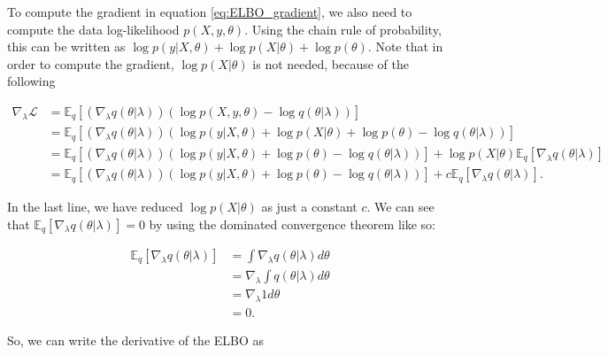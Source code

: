 To compute the gradient in equation \ref{eq:ELBO_gradient}, we also need to compute the data log-likelihood $p(X, y, \theta)$. Using the chain rule of probability, this can be written as $\log p(y | X, \theta) + \log p(X | \theta) + \log p(\theta)$. Note that in order to compute the gradient, $\log p(X | \theta)$ is not needed, because of the following

\begin{equation*}
  \begin{split}
      \nabla_{\lambda} \mathcal{L} &=
      \mathbb{E}_q \left[ \left( \nabla_{\lambda} q(\theta | \lambda) \right) \left( \log p(X, y, \theta) - \log q(\theta | \lambda) \right) \right] \\
      &= \mathbb{E}_q \left[ \left( \nabla_{\lambda} q(\theta | \lambda) \right) \left( \log p(y | X, \theta) + \log p(X | \theta) + \log p(\theta) - \log q(\theta | \lambda) \right) \right] \\
      &= \mathbb{E}_q \left[ \left( \nabla_{\lambda} q(\theta | \lambda) \right) \left( \log p(y | X, \theta) + \log p(\theta) - \log q(\theta | \lambda) \right) \right] +  \log p(X | \theta) \mathbb{E}_q \left[ \nabla_{\lambda} q(\theta | \lambda) \right] \\
      &= \mathbb{E}_q \left[ \left( \nabla_{\lambda} q(\theta | \lambda) \right) \left( \log p(y | X, \theta) + \log p(\theta) - \log q(\theta | \lambda) \right) \right] +  c \mathbb{E}_q \left[ \nabla_{\lambda} q(\theta | \lambda) \right].
  \end{split}
\end{equation*}

In the last line, we have reduced $\log p(X | \theta)$ as just a constant $c$. We can see that $\mathbb{E}_q \left[ \nabla_{\lambda} q(\theta | \lambda) \right] = 0$ by using the dominated convergence theorem \cite{ranganath2014black} like so:

\begin{equation*}
  \begin{split}
      \mathbb{E}_q \left[ \nabla_{\lambda} q(\theta | \lambda) \right] &=
      \int \nabla_{\lambda} q(\theta | \lambda) d\theta \\
      &= \nabla_{\lambda} \int q(\theta | \lambda) d\theta \\
      &= \nabla_{\lambda} 1 d\theta \\
      &= 0.
  \end{split}
\end{equation*}

So, we can write the derivative of the ELBO as

